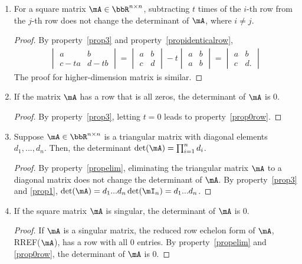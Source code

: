 \documentclass[11pt]{article}
\theoremstyle{plain}
\theoremstyle{definition}
\begin{document}
\begin{enumerate}
	\item \label{propelim} For a square matrix $\mA \in \bbR^{n \times n}$, subtracting $t$ times of the $i$-th row from the $j$-th row does not change the determinant of $\mA$, where $i \neq j$.
	\begin{proof}
		By property~\ref{prop3} and property~\ref{propidenticalrow}, 
	\begin{align}
		 \begin{vmatrix}
			a & b \\ c - ta&d -tb
		\end{vmatrix} = \begin{vmatrix}
			a & b \\ c &d
		\end{vmatrix} -t \begin{vmatrix}
			a & b \\ a& b
		\end{vmatrix}  = \begin{vmatrix}
			a & b \\ c &d.
		\end{vmatrix}
	\end{align}
	The proof for higher-dimension matrix is similar.
	\end{proof}
	
	\item\label{prop0row} If the matrix $\mA$ has a row that is all zeros, the determinant of $\mA$ is 0.
	\begin{proof}
		By property~\ref{prop3}, letting $t = 0$ leads to property~\ref{prop0row}.
	\end{proof}

	
	\item\label{propdiag} Suppose $\mA \in \bbR^{n \times n}$ is a triangular matrix with diagonal elements $d_1,...,d_n$. Then, the determinant $\det(\mA) = \prod_{i = 1}^n d_i$. 
	\begin{proof}
		By property~\ref{propelim}, eliminating the triangular matrix $\mA$ to a diagonal matrix does not change the determinant of $\mA$. By property~\ref{prop3} and \ref{prop1}, $\det(\mA) = d_1 ...d_n \det(\mI_n) = d_1 ...d_n $. 
	\end{proof}

	
	\item\label{propsingular} If the square matrix $\mA$ is singular, the determinant of $\mA$ is 0.
	
	\begin{proof}
		If $\mA$ is a singular matrix, the reduced row echelon form of $\mA$, RREF($\mA$), has a row with all 0 entries. By property~\ref{propelim} and \ref{prop0row}, the determinant of $\mA$ is 0.
	\end{proof}


\end{enumerate}
\end{document}
